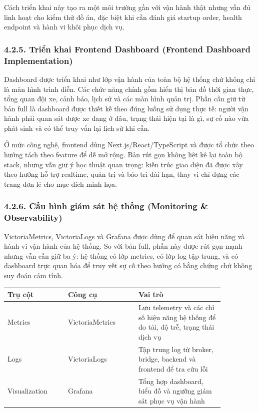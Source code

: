 \documentclass[a4paper]{extarticle}
\begin{document}
Cách triển khai này tạo ra một môi trường gần với vận hành thật nhưng vẫn đủ linh hoạt cho kiểm thử đồ án, đặc biệt khi cần đánh giá startup order, health endpoint và hành vi khôi phục dịch vụ.

\subsubsection{4.2.5. Triển khai Frontend Dashboard (Frontend Dashboard
Implementation)}\label{425-triux1ec3n-khai-frontend-dashboard-frontend-dashboard-implementation}

Dashboard được triển khai như lớp vận hành của toàn bộ hệ thống chứ không chỉ là màn hình trình diễn. Các chức năng chính gồm hiển thị bản đồ thời gian thực, tổng quan đội xe, cảnh báo, lịch sử và các màn hình quản trị. Phần cần giữ từ bản full là dashboard được thiết kế theo đúng luồng sử dụng thực tế: người vận hành phải quan sát được xe đang ở đâu, trạng thái hiện tại là gì, sự cố nào vừa phát sinh và có thể truy vấn lại lịch sử khi cần.

Ở mức công nghệ, frontend dùng Next.js/React/TypeScript và được tổ chức theo hướng tách theo feature để dễ mở rộng. Bản rút gọn không liệt kê lại toàn bộ stack, nhưng vẫn giữ ý học thuật quan trọng: kiến trúc giao diện đã được xây theo hướng hỗ trợ realtime, quản trị và bảo trì dài hạn, thay vì chỉ dựng các trang đơn lẻ cho mục đích minh họa.

\subsubsection{4.2.6. Cấu hình giám sát hệ thống (Monitoring \&
Observability)}\label{426-cux1ea5u-huxecnh-giuxe1m-suxe1t-hux1ec7-thux1ed1ng-monitoring--observability}

VictoriaMetrics, VictoriaLogs và Grafana được dùng để quan sát hiệu năng và hành vi vận hành của hệ thống. So với bản full, phần này được rút gọn mạnh nhưng vẫn cần giữ ba ý: hệ thống có lớp metrics, có lớp log tập trung, và có dashboard trực quan hóa để truy vết sự cố theo hướng có bằng chứng chứ không suy đoán cảm tính.

\begin{center}
\begin{tabular}{|p{0.24\linewidth}|p{0.28\linewidth}|p{0.34\linewidth}|}
\hline
\textbf{Trụ cột} & \textbf{Công cụ} & \textbf{Vai trò} \\
\hline
Metrics & VictoriaMetrics & Lưu telemetry và các chỉ số hiệu năng hệ thống để đo tải, độ trễ, trạng thái dịch vụ \\
\hline
Logs & VictoriaLogs & Tập trung log từ broker, bridge, backend và frontend để tra cứu lỗi \\
\hline
Visualization & Grafana & Tổng hợp dashboard, biểu đồ và ngưỡng giám sát phục vụ vận hành \\
\hline
\end{tabular}
\end{center}
\end{document}
